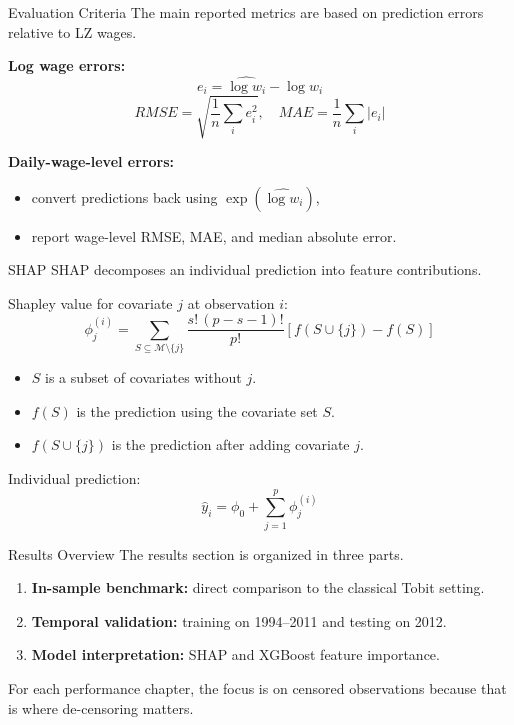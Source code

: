 \documentclass[10pt]{beamer}
\begin{document}
\begin{frame}{Evaluation Criteria}
The main reported metrics are based on prediction errors relative to LZ wages.

\vspace{0.3cm}
\textbf{Log wage errors:}
\[
e_i = \widehat{\log w_i} - \log w_i
\]
\[
RMSE = \sqrt{\frac{1}{n}\sum_i e_i^2}, \quad
MAE = \frac{1}{n}\sum_i |e_i|
\]

\vspace{0.3cm}
\textbf{Daily-wage-level errors:}
\begin{itemize}
    \item convert predictions back using $\exp(\widehat{\log w_i})$,
    \item report wage-level RMSE, MAE, and median absolute error.
\end{itemize}
\end{frame}

\begin{frame}{SHAP \cite{shap}}
SHAP decomposes an individual prediction into feature contributions.

\vspace{0.2cm}
Shapley value for covariate $j$ at observation $i$:
\[
\phi_j^{(i)} =
\sum_{S \subseteq \mathcal{M} \setminus \{j\}}
\frac{s!\,(p-s-1)!}{p!}
\left[ f(S \cup \{j\}) - f(S) \right]
\]

\vspace{0.2cm}
\begin{itemize}
    \item $S$ is a subset of covariates without $j$.
    \item $f(S)$ is the prediction using the covariate set $S$.
    \item $f(S \cup \{j\})$ is the prediction after adding covariate $j$.
\end{itemize}

\vspace{0.2cm}
Individual prediction:
\[
\hat{y}_i = \phi_0 + \sum_{j=1}^p \phi_j^{(i)}
\]
\end{frame}

\begin{frame}{Results Overview}
The results section is organized in three parts.

\vspace{0.3cm}
\begin{enumerate}
    \item \textbf{In-sample benchmark:} direct comparison to the classical Tobit setting.
    \item \textbf{Temporal validation:} training on 1994--2011 and testing on 2012.
    \item \textbf{Model interpretation:} SHAP and XGBoost feature importance.
\end{enumerate}

\vspace{0.3cm}
For each performance chapter, the focus is on censored observations because that is where de-censoring matters.
\end{frame}
\end{document}
